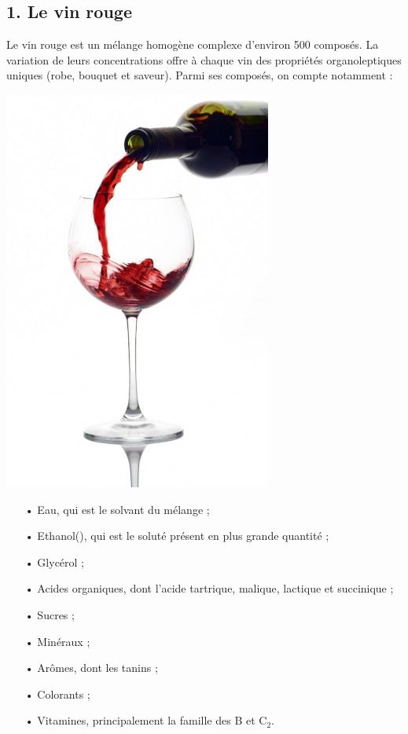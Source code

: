 \documentclass[11pt]{article}
\begin{document}
\subsection*{1. Le vin rouge}
Le  vin  rouge  est  un  mélange  homogène  complexe  d’environ  500  composés.  La  variation  de  leurs concentrations  offre  à  chaque  vin  des  propriétés  organoleptiques  uniques  (robe,  bouquet  et  saveur). Parmi ses composés, on compte notamment :\\
\begin{minipage}{.2\textwidth}%
\includegraphics[scale=0.3]{vin1.jpg}
\end{minipage}
\begin{minipage}{.8\textwidth}%
\begin{itemize}
\item[•]Eau\footnotemark[1], qui est le solvant du mélange ; 
\item[•]Ethanol\footnotemark[2] (), qui est le soluté présent en plus grande quantité ; 
\item[•]Glycérol ;
\item[•]Acides organiques, dont l’acide tartrique, malique, lactique et succinique ;
\item[•]Sucres ;
\item[•]Minéraux ;
\item[•]Arômes, dont les tanins ;
\item[•]Colorants ;
\item[•]Vitamines, principalement la famille des B et C$_2$.
\end{itemize}
\end{minipage}\\ 
\end{document}
